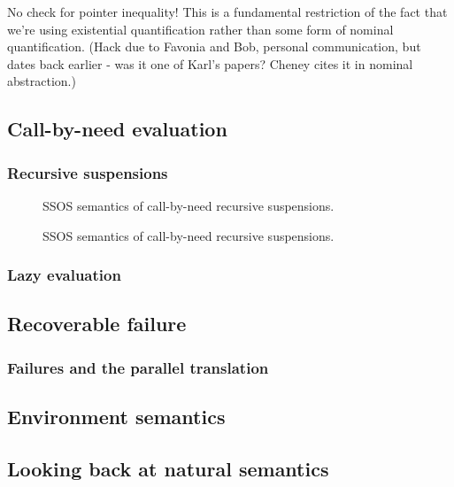 No check for pointer inequality! This is a fundamental restriction of
the fact that we're using existential quantification rather than some
form of nominal quantification. (Hack due to Favonia and Bob, personal
communication, but dates back earlier - was it one of Karl's papers?
Cheney cites it in nominal abstraction.)

\subsection{Call-by-need evaluation}
\label{sec:call-by-need}

\subsubsection{Recursive suspensions}

\begin{figure}[t]
\caption{SSOS semantics of call-by-need recursive suspensions.}
\label{fig:ssos-cbneed}
\end{figure}

\begin{figure}
\caption{SSOS semantics of call-by-need recursive suspensions.}
\label{fig:ssos-cbneed-refun}
\end{figure}

\subsubsection{Lazy evaluation}



\subsection{Recoverable failure}
\label{sec:failure}

\subsubsection{Failures and the parallel translation}

\subsection{Environment semantics}

\subsection{Looking back at natural semantics}
\label{sec:enriching-natsem}

